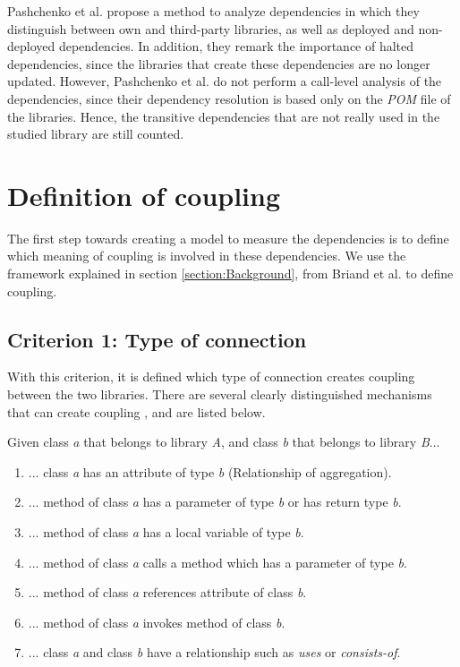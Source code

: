 \documentclass[a4paper]{article}
\begin{document}
Pashchenko et al. \cite{pashchenko2018vulnerable} propose a method to analyze dependencies in which they distinguish between own and third-party libraries, as well as deployed and non-deployed dependencies. In addition, they remark the importance of halted dependencies, since the libraries that create these dependencies are no longer updated. However, Pashchenko et al. do not perform a call-level analysis of the dependencies, since their dependency resolution is based only on the \textit{POM} file of the libraries. Hence, the transitive dependencies that are not really used in the studied library are still counted.

\section{Definition of coupling}\label{section:defCoupling}
The first step towards creating a model to measure the dependencies is to define which meaning of coupling is involved in these dependencies. We use the framework explained in section \ref{section:Background}, from Briand et al. \cite{briand1999unified} to define coupling.

\subsection{Criterion 1: Type of connection}
With this criterion, it is defined which type of connection creates coupling between the two libraries. There are several clearly distinguished mechanisms that can create coupling \cite{briand1999unified}, and are listed below.

Given class \textit{a} that belongs to library \textit{A}, and class \textit{b} that belongs to library \textit{B}...

\begin{enumerate}[noitemsep,leftmargin=*]
  \item ... class \textit{a} has an attribute of type \textit{b} (Relationship of aggregation).
  \item ... method of class \textit{a} has a parameter of type \textit{b} or has return type \textit{b}.
  \item ... method of class \textit{a} has a local variable of type \textit{b}.
  \item ... method of class \textit{a} calls a method which has a parameter of type \textit{b}.
  \item ... method of class \textit{a} references attribute of class \textit{b}.
  \item ... method of class \textit{a} invokes method of class \textit{b}.
  \item ... class \textit{a} and class \textit{b} have a relationship such as \textit{uses} or \textit{consists-of}.
\end{enumerate}
\end{document}
